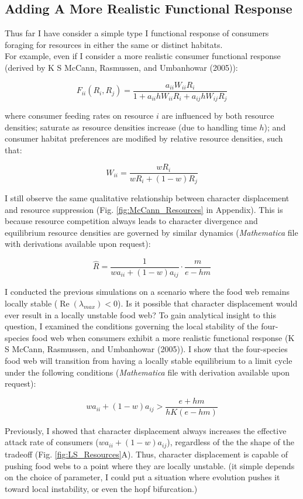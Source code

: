 \documentclass[11pt,]{article}
\begin{document}
\subsection{Adding A More Realistic Functional
Response}\label{adding-a-more-realistic-functional-response}

Thus far I have consider a simple type I functional response of
consumers foraging for resources in either the same or distinct
habitats.\\
For example, even if I consider a more realistic consumer functional
response (derived by K S McCann, Rasmussen, and Umbanhowar (2005)):

\[F_{ii}(R_i,R_j)=\frac{a_{ii}W_{ii}R_i}{1+a_{ii}hW_{ii}R_i+a_{ij}hW_{ij}R_j}\]

where consumer feeding rates on resource \(i\) are influenced by both
resource densities; saturate as resource densities increase (due to
handling time \(h\)); and consumer habitat preferences are modified by
relative resource densities, such that:

\[W_{ii}=\frac{wR_i}{wR_i+(1-w)R_j}\]

I still observe the same qualitative relationship between character
displacement and resource suppression (Fig. \ref{fig:McCann_Resources}
in Appendix). This is because resource competition always leads to
character divergence and equilibrium resource densities are governed by
similar dynamics (\emph{Mathematica} file with derivations available
upon request):

\[\hat{R}=\frac{1}{wa_{ii}+(1-w)a_{ij}}\cdot\frac{m}{e-hm}\]

I conducted the previous simulations on a scenario where the food web
remains locally stable (\(\operatorname{Re}(\lambda_{max})<0\)). Is it
possible that character displacement would ever result in a locally
unstable food web? To gain analytical insight to this question, I
examined the conditions governing the local stability of the
four-species food web when consumers exhibit a more realistic functional
response (K S McCann, Rasmussen, and Umbanhowar (2005)). I show that the
four-species food web will transition from having a locally stable
equilibrium to a limit cycle under the following conditions
(\emph{Mathematica} file with derivation available upon request):

\[wa_{ii}+(1-w)a_{ij} > \frac{e+hm}{hK(e-hm)}\]

Previously, I showed that character displacement always increases the
effective attack rate of consumers (\(wa_{ii}+(1-w)a_{ij}\)), regardless
of the the shape of the tradeoff (Fig. \ref{fig:LS_Resources}A). Thus,
character displacement is capable of pushing food webs to a point where
they are locally unstable. (it simple depends on the choice of
parameter, I could put a situation where evolution pushes it toward
local instability, or even the hopf bifurcation.)
\end{document}
